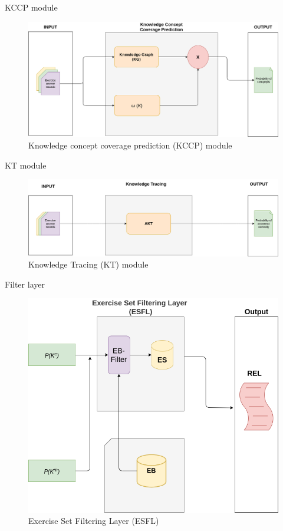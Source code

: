 \documentclass[10pt,a4paper,openany]{beamer}
\begin{document}
	\begin{frame}{KCCP module}
		\begin{figure}[htbp]
			\centerline{\includegraphics[scale=0.3]{charts/kgcp.png}}
			\label{fig_motivation3}
			\caption{Knowledge concept coverage prediction (KCCP) module}
		\end{figure}
	\end{frame}
	
	\begin{frame}{KT module}
		\begin{figure}[htbp]
			\centerline{\includegraphics[scale=0.3]{charts/kt.png}}
			\label{fig_motivation3}
			\caption{Knowledge Tracing (KT) module}
		\end{figure}
	\end{frame}	
	
	\begin{frame}{Filter layer}
		\begin{figure}[htbp]
			\centerline{\includegraphics[scale=0.35]{charts/filterlayer.png}}
			\label{fig_motivation3}
			\caption{Exercise Set Filtering Layer (ESFL)}
		\end{figure}
	\end{frame}
	
\end{document}
